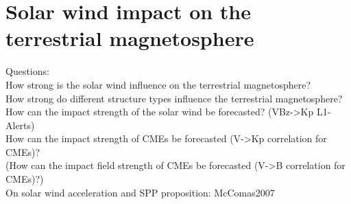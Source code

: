 
\chapter{Solar wind impact on the terrestrial magnetosphere}


Questions:\\
	How strong is the solar wind influence on the terrestrial magnetosphere?\\
	How strong do different structure types influence the terrestrial magnetosphere?\\
	
	How can the impact strength of the solar wind be forecasted? (VBz->Kp L1-Alerts)\\
	How can the impact strength of CMEs be forecasted (V->Kp correlation for CMEs)?\\
	(How can the impact field strength of CMEs be forecasted (V->B correlation for CMEs)?)\\

On solar wind acceleration and SPP proposition: McComas2007\\


